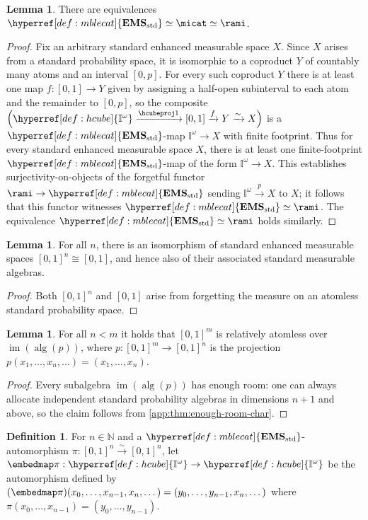 \documentclass[
  sigconf,
  screen, ]{acmart}
\theoremstyle{definition}
\newtheorem{lemma}[theorem]{Lemma}
\newtheorem{definition}[theorem]{Definition}
\newcommand\img{\operatorname{im}}
\newcommand\N{\mathbb N}
\newcommand\nref[2]{\hyperref[#1]{#2}} \newcommand\checkhigh{{\huge{\color{red}\textbf{TODO: check}}}}
\newcommand\measalg{\operatorname{\nref{app:cons:measalg}{alg}}}
\newcommand\texhcube{{{{\mathbb I}^\omega}}}
\newcommand\hcube{{\nref{def:hcube}{\texhcube}}}
\newcommand\texStdMble{\mathbf{EMS}_{\rm std}}
\newcommand\StdMble{{\nref{def:mblecat}{\texStdMble}}}
\begin{document}
\begin{lemma} \label{app:lem:raii-eq}
  There are equivalences $\StdMble\simeq\micat\simeq\rami$.
\end{lemma}
\begin{proof}
  Fix an arbitrary standard enhanced measurable space $X$.
  Since $X$ arises from a standard probability space,
  it is isomorphic to a coproduct $Y$ of countably many atoms
  and an interval $[0,p]$. For every such coproduct $Y$
  there is at least one map $f : [0,1]\to Y$
  given by assigning a half-open subinterval
  to each atom and the remainder to $[0,p]$,
  so the composite $\left(\hcube\xrightarrow{\hcubeproj1}[0,1]\xrightarrow fY\xrightarrow\sim X\right)$
  is a $\StdMble$-map $\hcube\to X$ with finite footprint.
  Thus for every standard enhanced measurable space $X$,
  there is at least one finite-footprint $\StdMble$-map
  of the form $\hcube\to X$.
  This establishes surjectivity-on-objects
  of the forgetful functor $\rami\to\StdMble$
  sending $\hcube\xrightarrow pX$
  to $X$; it follows that this functor witnesses $\StdMble\simeq\rami$.
  The equivalence 
  $\StdMble\simeq\rami$ holds similarly.
\end{proof}

\newcommand\caninc{\mathrm{inc}}

\begin{lemma} \label{app:lem:hcube-measalg-iso}
  For all $n$,
  there is an isomorphism of standard enhanced measurable spaces
  $[0,1]^n\cong[0,1]$,
  and hence also of their associated standard measurable algebras.
\end{lemma}
\begin{proof}
  Both $[0,1]^n$ and $[0,1]$ arise from
  forgetting the measure on an
  atomless standard probability space.
\end{proof}

\begin{lemma} \label{app:lem:proj-relatomless}
  For all $n < m$ it holds that
  $[0,1]^m$ is relatively atomless over $\img(\measalg(p))$,
  where $p : [0,1]^m\to[0,1]^n$
  is the projection $p(x_1,\dots,x_n,\dots) = (x_1,\dots,x_n)$.
\end{lemma}
\begin{proof}
  Every subalgebra $\img(\measalg(p))$
  has enough room: one can always allocate
  independent standard probability algebras in dimensions
  $n+1$ and above,
  so the claim follows from \cref{app:thm:enough-room-char}.
\end{proof}

\begin{definition} \label{app:def:embedmap}
  For $n\in \N$
  and a $\StdMble$-automorphism $\pi : [0,1]^n\xrightarrow\sim [0,1]^n$,
  let $\embedmap \pi : \hcube\to\hcube$
  be the automorphism
  defined by $(\embedmap \pi)(x_0,\dots,x_{n-1},x_n,\dots)
  =(y_0,\dots,y_{n-1},x_n,\dots)$
  where $\pi(x_0,\dots,x_{n-1}) = (y_0,\dots,y_{n-1})$.
\end{definition}
\end{document}
